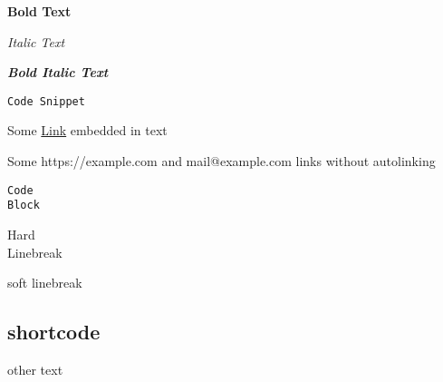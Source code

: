 \textbf{Bold Text}

\textit{Italic Text}

\textit{\textbf{Bold Italic Text}}

\texttt{Code Snippet}

Some \href{https://example.com/}{Link} embedded in text

Some https://example.com and mail@example.com links without autolinking

\begin{lstlisting}
Code
Block
\end{lstlisting}

Hard\\
Linebreak

soft linebreak

\subsection*{shortcode}

\vspace{0.5cm}

other text
